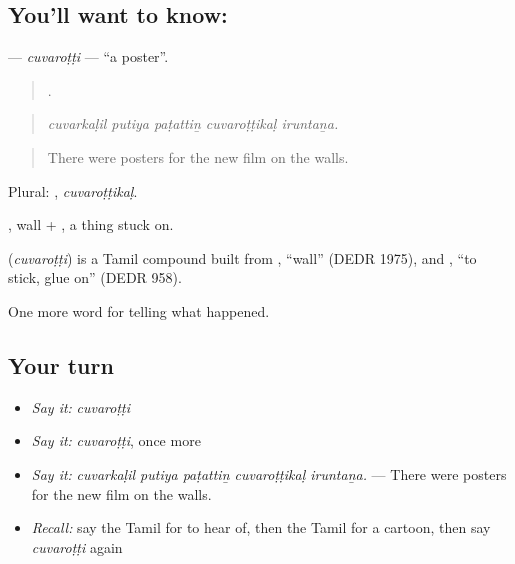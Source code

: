 \subsection*{You'll want to know: }
\textbf{} — \emph{cuvaroṭṭi} — \textquotedblleft{}a poster\textquotedblright{}.

\begin{quote}
    .
\end{quote}

\begin{quote}
\emph{cuvarkaḷil putiya paṭattiṉ cuvaroṭṭikaḷ iruntaṉa.}
\end{quote}

\begin{quote}
There were posters for the new film on the walls.
\end{quote}

Plural: , \emph{cuvaroṭṭikaḷ}.

, wall + , a thing stuck on.

\begin{cousinweb}
\textbf{} (\emph{cuvaroṭṭi}) is a Tamil compound built from , \textquotedblleft{}wall\textquotedblright{} (DEDR 1975), and , \textquotedblleft{}to stick, glue on\textquotedblright{} (DEDR 958).
\end{cousinweb}

\begin{grammarlens}[title={What you've built}]
One more word for telling what happened.
\end{grammarlens}

\subsection*{Your turn}
\begin{itemize}
\raggedright
  \item \emph{Say it:} \emph{cuvaroṭṭi}
  \item \emph{Say it:} \emph{cuvaroṭṭi}, once more
  \item \emph{Say it:} \emph{cuvarkaḷil putiya paṭattiṉ cuvaroṭṭikaḷ iruntaṉa.} — There were posters for the new film on the walls.
  \item \emph{Recall:} say the Tamil for to hear of, then the Tamil for a cartoon, then say \emph{cuvaroṭṭi} again
\end{itemize}

